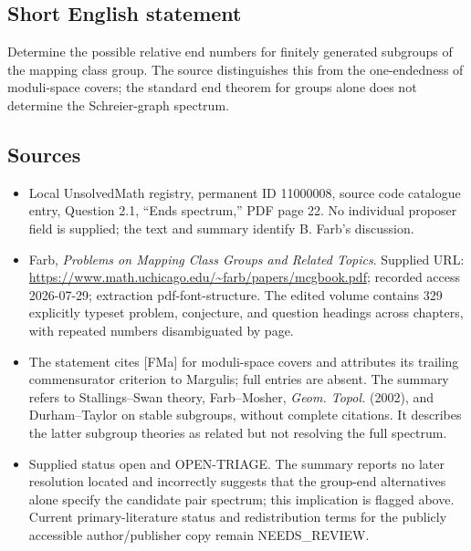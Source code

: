 \documentclass[11pt]{article}
\begin{document}
\subsection{Short English statement}
Determine the possible relative end numbers for finitely generated subgroups of the mapping class group. The source distinguishes this from the one-endedness of moduli-space covers; the standard end theorem for groups alone does not determine the Schreier-graph spectrum.
\subsection{Sources}
\begin{itemize}
\item Local UnsolvedMath registry, permanent ID 11000008, source code catalogue entry, Question 2.1, ``Ends spectrum,'' PDF page 22. No individual proposer field is supplied; the text and summary identify B. Farb's discussion.
\item Farb, \emph{Problems on Mapping Class Groups and Related Topics}. Supplied URL: \url{https://www.math.uchicago.edu/~farb/papers/mcgbook.pdf}; recorded access 2026-07-29; extraction pdf-font-structure. The edited volume contains 329 explicitly typeset problem, conjecture, and question headings across chapters, with repeated numbers disambiguated by page.
\item The statement cites [FMa] for moduli-space covers and attributes its trailing commensurator criterion to Margulis; full entries are absent. The summary refers to Stallings--Swan theory, Farb--Mosher, \emph{Geom. Topol.} (2002), and Durham--Taylor on stable subgroups, without complete citations. It describes the latter subgroup theories as related but not resolving the full spectrum.
\item Supplied status open and OPEN-TRIAGE. The summary reports no later resolution located and incorrectly suggests that the group-end alternatives alone specify the candidate pair spectrum; this implication is flagged above. Current primary-literature status and redistribution terms for the publicly accessible author/publisher copy remain NEEDS\_REVIEW.
\end{itemize}
\end{document}

